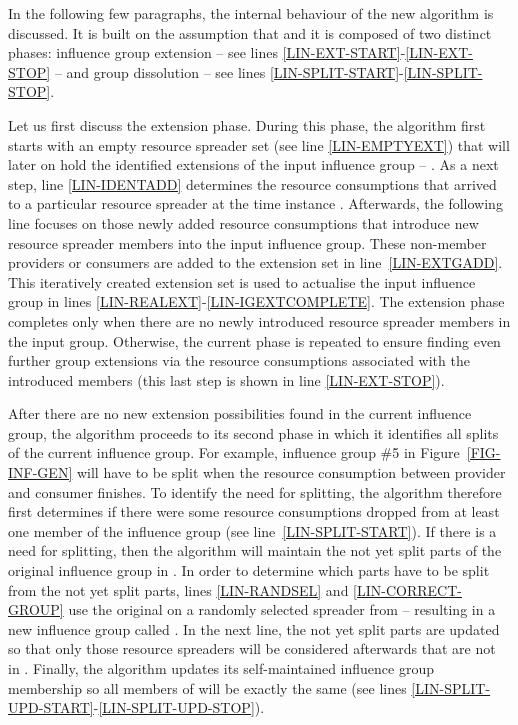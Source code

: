 \documentclass[sort, compress, 5p]{elsarticle}
\begin{document}
In the following few paragraphs, the internal behaviour of the new algorithm is discussed. It is built on the assumption that  and it is composed of two distinct phases: influence group extension -- see lines \ref{LIN-EXT-START}-\ref{LIN-EXT-STOP} -- and group dissolution -- see lines \ref{LIN-SPLIT-START}-\ref{LIN-SPLIT-STOP}.

Let us first discuss the extension phase. During this phase, the algorithm first starts with an empty resource spreader set (see line \ref{LIN-EMPTYEXT}) that will later on hold the identified extensions of the input influence group -- . As a next step, line \ref{LIN-IDENTADD} determines the resource consumptions that arrived to a particular resource spreader at the time instance . Afterwards, the following line focuses on those newly added resource consumptions that introduce new resource spreader members into the input influence group. These non-member providers or consumers are added to the extension set in line~\ref{LIN-EXTGADD}. This iteratively created extension set is used to actualise the input influence group in lines \ref{LIN-REALEXT}-\ref{LIN-IGEXTCOMPLETE}. The extension phase completes only when there are no newly introduced resource spreader members in the input group. Otherwise, the current phase is repeated to ensure finding even further group extensions via the resource consumptions associated with the introduced members (this last step is shown in line \ref{LIN-EXT-STOP}).

After there are no new extension possibilities found in the current influence group, the algorithm proceeds to its second phase in which it identifies all splits of the current influence group. For example, influence group \#5 in Figure~\ref{FIG-INF-GEN} will have to be split when the resource consumption between provider  and consumer  finishes. To identify the need for splitting, the algorithm therefore first determines if there were some resource consumptions dropped from at least one member of the influence group (see line~\ref{LIN-SPLIT-START}). If there is a need for splitting, then the algorithm will maintain the not yet split parts of the original influence group in . In order to determine which parts have to be split from the not yet split parts, lines \ref{LIN-RANDSEL} and \ref{LIN-CORRECT-GROUP} use the original  on a randomly selected spreader from  -- resulting in a new influence group called . In the next line, the not yet split parts are updated so that only those resource spreaders will be considered afterwards that are not in . Finally, the algorithm updates its self-maintained influence group membership so all members of  will be exactly the same (see lines \ref{LIN-SPLIT-UPD-START}-\ref{LIN-SPLIT-UPD-STOP}).
\end{document}
